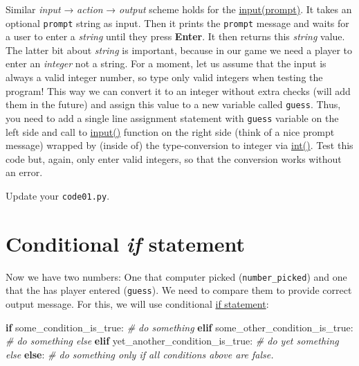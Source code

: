 \documentclass[
]{book}
\newenvironment{Shaded}{\begin{snugshade}}{\end{snugshade}}
\newcommand{\CommentTok}[1]{\textcolor[rgb]{0.56,0.35,0.01}{\textit{#1}}}
\newcommand{\ControlFlowTok}[1]{\textcolor[rgb]{0.13,0.29,0.53}{\textbf{#1}}}
\newcommand{\NormalTok}[1]{#1}
\begin{document}
Similar \emph{input} → \emph{action} → \emph{output} scheme holds for the \href{https://docs.python.org/3/library/functions.html\#input}{input(prompt)}. It takes an optional \texttt{prompt} string as input. Then it prints the \texttt{prompt} message and waits for a user to enter a \emph{string} until they press \textbf{Enter}. It then returns this \emph{string} value. The latter bit about \emph{string} is important, because in our game we need a player to enter an \emph{integer} not a string. For a moment, let us assume that the input is always a valid integer number, so type only valid integers when testing the program! This way we can convert it to an integer without extra checks (will add them in the future) and assign this value to a new variable called \texttt{guess}. Thus, you need to add a single line assignment statement with \texttt{guess} variable on the left side and call to \href{https://docs.python.org/3/library/functions.html\#input}{input()} function on the right side (think of a nice prompt message) wrapped by (inside of) the type-conversion to integer via \href{https://docs.python.org/3/library/functions.html\#int}{int()}. Test this code but, again, only enter valid integers, so that the conversion works without an error.

Update your \texttt{code01.py}.

\hypertarget{if-statement}{%
\section{\texorpdfstring{Conditional \emph{if} statement}{Conditional if statement}}\label{if-statement}}

Now we have two numbers: One that computer picked (\texttt{number\_picked}) and one that the has player entered (\texttt{guess}). We need to compare them to provide correct output message. For this, we will use conditional \href{https://docs.python.org/3/tutorial/controlflow.html\#if-statements}{if statement}:

\begin{Shaded}
\begin{Highlighting}[]
\ControlFlowTok{if}\NormalTok{ some\_condition\_is\_true:}
    \CommentTok{\# do something}
\ControlFlowTok{elif}\NormalTok{ some\_other\_condition\_is\_true:}
    \CommentTok{\# do something else}
\ControlFlowTok{elif}\NormalTok{ yet\_another\_condition\_is\_true:}
    \CommentTok{\# do yet something else}
\ControlFlowTok{else}\NormalTok{:}
    \CommentTok{\# do something only if all conditions above are false.}
\end{Highlighting}
\end{Shaded}
\end{document}
